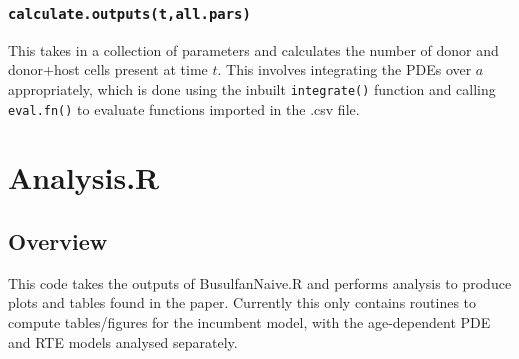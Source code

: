 \documentclass{tufte-book} %
\begin{document}
\subsection{\texttt{calculate.outputs(t,all.pars)}}
This takes in a collection of parameters and calculates the number of donor and donor+host cells present at time $t$. This involves integrating the PDEs over $a$ appropriately, which is done using the inbuilt \texttt{integrate()} function and calling \texttt{eval.fn()} to evaluate functions imported in the .csv file.


\chapter{Analysis.R}
\label{ch:4}


\section{Overview}

\begin{fullwidth}

This code takes the outputs of BusulfanNaive.R and performs analysis to produce plots and tables found in the paper. Currently this only contains routines to compute tables/figures for the incumbent model, with the age-dependent PDE and RTE models analysed separately.

\end{fullwidth}
\end{document}
